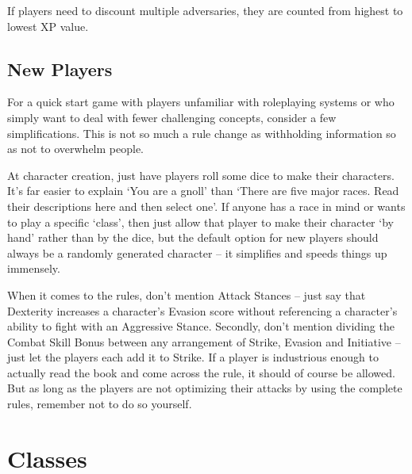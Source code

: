 \begin{multicols}{2}
If players need to discount multiple adversaries, they are counted from highest to lowest XP value.

\subsection{New Players}

For a quick start game with players unfamiliar with roleplaying systems or who simply want to deal with fewer challenging concepts, consider a few simplifications. This is not so much a rule change as withholding information so as not to overwhelm people.

At character creation, just have players roll some dice to make their characters.  It's far easier to explain `You are a gnoll' than `There are five major races.  Read their descriptions here and then select one'.  If anyone has a race in mind or wants to play a specific `class', then just allow that player to make their character `by hand' rather than by the dice, but the default option for new players should always be a randomly generated character -- it simplifies and speeds things up  immensely.

When it comes to the rules, don't mention Attack Stances -- just say that Dexterity increases a character's Evasion score without referencing a character's ability to fight with an Aggressive Stance.  Secondly, don't mention dividing the Combat Skill Bonus between any arrangement of Strike, Evasion and Initiative -- just let the players each add it to Strike. If a player is industrious enough to actually read the book and come across the rule, it should of course be allowed. But as long as the players are not optimizing their attacks by using the complete rules, remember not to do so yourself.

\end{multicols}

\section{Classes}

